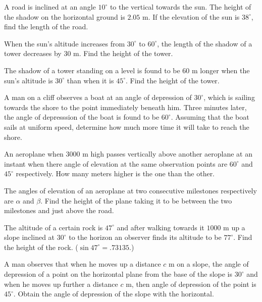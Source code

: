 \item A road is inclined at an angle $10^\circ$ to the vertical towards the sun. The height of the shadow on the horizontal
  ground is $2.05$ m. If the elevation of the sun is $38^\circ$, find the length of the road.

\item When the sun's altitude increases from $30^\circ$ to $60^\circ$, the length of the shadow of a tower decreases
  by $30$ m. Find the height of the tower.

\item The shadow of a tower standing on a level is found to be $60$ m longer when the sun's altitude is $30^\circ$ than
  when it is $45^\circ$. Find the height of the tower.

\item A man on a cliff observes a boat at an angle of depression of $30^\circ$, which is sailing towards the shore to the
  point immediately beneath him. Three minutes later, the angle of depresssion of the boat is found to be
  $60^\circ$. Assuming that the boat sails at uniform speed, determine how much more time it will take to reach the shore.

\item An aeroplane when $3000$ m high passes vertically above another aeroplane at an instant when there angle of elevation at
  the same observation points are $60^\circ$ and $45^\circ$ respectively. How many meters higher is the one than the
  other.

\item The angles of elevation of an aeroplane at two consecutive milestones respectively are $\alpha$ and $\beta$. Find
  the height of the plane taking it to be between the two milestones and just above the road.

\item The altitude of a certain rock is $47^\circ$ and after walking towards it $1000$ m up a slope inclined at
  $30^\circ$ to the horizon an observer finds its altitude to be $77^\circ$. Find the height of the
  rock. ($\sin47^\circ = .73135$.)

\item A man observes that when he moves up a distance $c$ m on a slope, the angle of depression of a point on the horizontal
  plane from the base of the slope is $30^\circ$ and when he moves up further a distance $c$ m, then angle of
  depression of the point is $45^\circ$. Obtain the angle of depression of the slope with the horizontal.


